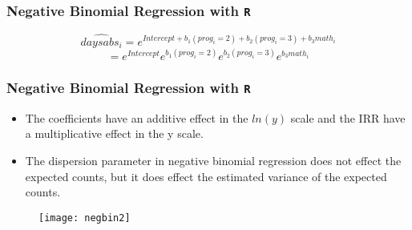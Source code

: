 \documentclass[MASTER.tex]{subfiles}
\begin{document}
\begin{frame}[fragile]
	\frametitle{Negative Binomial Regression with \texttt{R} }
	\Large
	
	\[ \widehat{daysabs_i} = e^{Intercept + b_1(prog_i = 2) + b_2(prog_i = 3) + b_3math_i}\]\[ = e^{Intercept}e^{b_1(prog_i = 2)}e^{b_2(prog_i = 3)}e^{b_3math_i} \]

	\end{frame}
\begin{frame}
	\frametitle{Negative Binomial Regression with \texttt{R} }
	\Large
\begin{itemize}
\item The coefficients have an additive effect in the \(ln(y)\) scale and the IRR have a multiplicative effect 
in the y scale. 
\item The dispersion parameter in negative binomial regression does not effect the expected counts, 
but it does effect the estimated variance of the expected counts. 
\end{itemize}
\end{frame}	
	
%

\begin{frame}
	\begin{figure}
		\centering
		\texttt{[image: negbin2]}
	\end{figure}
	
\end{frame}
\end{document}
